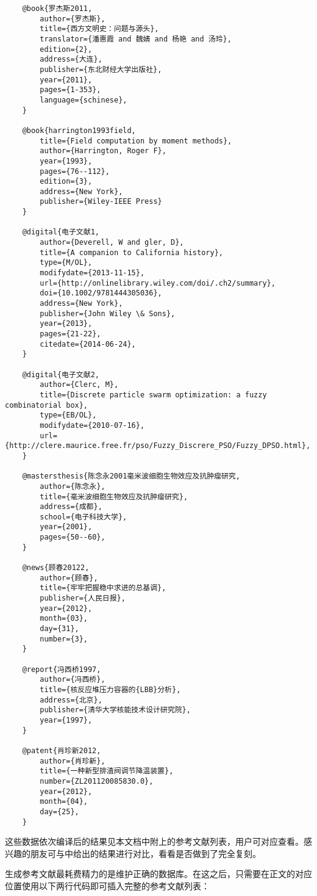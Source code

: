 \documentclass[print, doctor, vlined]{DissertUESTC}
\begin{document}
\begin{verbatim}
	@book{罗杰斯2011,
	    author={罗杰斯},
	    title={西方文明史：问题与源头},
	    translator={潘惠霞 and 魏婧 and 杨艳 and 汤玲},
	    edition={2},
	    address={大连},
	    publisher={东北财经大学出版社},
	    year={2011},
	    pages={1-353},
	    language={schinese},
	}
	
	@book{harrington1993field,
	    title={Field computation by moment methods},
	    author={Harrington, Roger F},
	    year={1993},
	    pages={76--112},
	    edition={3},
	    address={New York},
	    publisher={Wiley-IEEE Press}
	}
	
	@digital{电子文献1,
	    author={Deverell, W and gler, D},
	    title={A companion to California history},
	    type={M/OL},
	    modifydate={2013-11-15},
	    url={http://onlinelibrary.wiley.com/doi/.ch2/summary},
	    doi={10.1002/9781444305036},
	    address={New York},
	    publisher={John Wiley \& Sons},
	    year={2013},
	    pages={21-22},
	    citedate={2014-06-24},
	}
	
	@digital{电子文献2,
	    author={Clerc, M},
	    title={Discrete particle swarm optimization: a fuzzy combinatorial box},
	    type={EB/OL},
	    modifydate={2010-07-16},
	    url={http://clere.maurice.free.fr/pso/Fuzzy_Discrere_PSO/Fuzzy_DPSO.html},
	}
	
	@mastersthesis{陈念永2001毫米波细胞生物效应及抗肿瘤研究,
	    author={陈念永},
	    title={毫米波细胞生物效应及抗肿瘤研究},
	    address={成都},
	    school={电子科技大学},
	    year={2001},
	    pages={50--60},
	}
	
	@news{顾春20122,
	    author={顾春},
	    title={牢牢把握稳中求进的总基调},
	    publisher={人民日报},
	    year={2012},
	    month={03},
	    day={31},
	    number={3},
	}
	
	@report{冯西桥1997,
	    author={冯西桥},
	    title={核反应堆压力容器的{LBB}分析},
	    address={北京},
	    publisher={清华大学核能技术设计研究院},
	    year={1997},
	}
	
	@patent{肖珍新2012,
	    author={肖珍新},
	    title={一种新型排渣阀调节降温装置},
	    number={ZL201120085830.0},
	    year={2012},
	    month={04},
	    day={25},
	}
	\end{verbatim}
	
	这些数据依次编译后的结果见本文档中附上的参考文献列表，用户可对应查看。感兴趣的朋友可与\href{https://gr.uestc.edu.cn/xiazai/114/3917}{}中给出的结果进行对比，看看是否做到了完全复刻。
	
	生成参考文献最耗费精力的是维护正确的数据库。在这之后，只需要在正文的对应位置使用以下两行代码即可插入完整的参考文献列表：
	\begin{verbatim}
		
		
	\end{verbatim}
	
\end{document}

